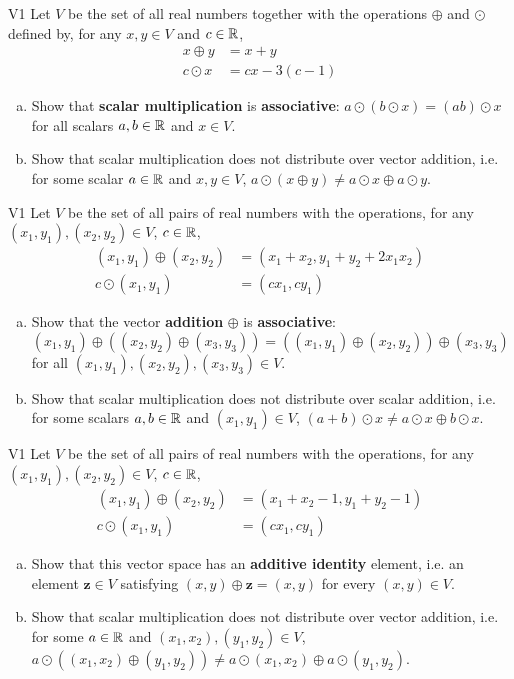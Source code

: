 \begin{problem}{V1}
Let \(V\) be the  set of all real numbers together with the operations \(\oplus\) and \(\odot\) defined by, for any \(x,y\in V\) and \(c\in \mathbb{R}\),
\begin{align*}
x\oplus y  &= x+y \\
c \odot x &= cx-3(c-1)
\end{align*}
\begin{enumerate}[(a)]
\item Show that \textbf{scalar multiplication} is
      \textbf{associative}: \(a\odot(b\odot x)=(ab)\odot x\) for all scalars \(a,b \in \mathbb{R}\) and \(x \in V\).
\item Show that scalar multiplication does not distribute over vector addition, i.e. for some scalar \(a \in \mathbb{R}\) and \(x,y\in V\), \(a \odot (x \oplus y) \neq a \odot x \oplus a \odot y\).
\end{enumerate}
\end{problem}


\begin{problem}{V1}
Let \(V\) be the set of all pairs of real numbers with the operations, for any \((x_1,y_1), (x_2,y_2) \in V\), \(c\in \mathbb{R}\),
\begin{align*}
(x_1,y_1) \oplus (x_2,y_2) &= (x_1+x_2,y_1+y_2+2x_1x_2) \\
c \odot (x_1,y_1) &= (cx_1, cy_1)
\end{align*}
\begin{enumerate}[(a)]
\item Show that the vector \textbf{addition} \(\oplus\) is \textbf{associative}:
      \((x_1,y_1) \oplus ((x_2,y_2) \oplus (x_3,y_3))=((x_1,y_1)\oplus (x_2,y_2))\oplus (x_3,y_3)\) for all \((x_1,y_1), (x_2,y_2), (x_3,y_3) \in V\).
\item Show that scalar multiplication does not distribute over scalar addition, i.e. for some scalars \(a,b \in \mathbb{R}\) and \((x_1,y_1) \in V\), \( (a+b) \odot x \neq a\odot x \oplus b \odot x\).
\end{enumerate}
\end{problem}



\begin{problem}{V1}
Let \(V\) be the set of all pairs of real numbers with the operations, for any \((x_1,y_1), (x_2,y_2) \in V\), \(c\in \mathbb{R}\),
\begin{align*}
(x_1,y_1) \oplus (x_2,y_2) &= (x_1+x_2-1,y_1+y_2-1) \\
c \odot (x_1,y_1) &= (cx_1, cy_1)
\end{align*}
\begin{enumerate}[(a)]
\item Show that this vector space has an \textbf{additive identity} element, i.e. an element
      \(\mathbf{z} \in V\) satisfying \((x,y)\oplus\mathbf{z}=(x,y)\) for every \((x,y) \in V\).
\item Show that scalar multiplication does not distribute over vector addition, i.e. for some \(a \in \mathbb{R}\) and \( (x_1,x_2), (y_1,y_2) \in V\), \(a \odot \left( (x_1,x_2)\oplus (y_1,y_2) \right) \neq a \odot (x_1,x_2) \oplus a \odot (y_1,y_2) \).
\end{enumerate}
\end{problem}

